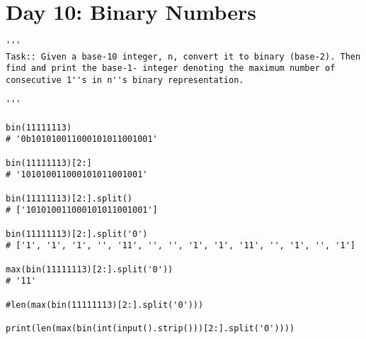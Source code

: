 \documentclass[11pt,a4paper]{article}
\begin{document}
\newpage
\section{Day 10: Binary Numbers}
\begin{lstlisting}
'''
Task:: Given a base-10 integer, n, convert it to binary (base-2). Then find and print the base-1- integer denoting the maximum number of consecutive 1''s in n''s binary representation.

'''

bin(11111113)
# '0b101010011000101011001001'

bin(11111113)[2:]
# '101010011000101011001001'

bin(11111113)[2:].split()
# ['101010011000101011001001']

bin(11111113)[2:].split('0')
# ['1', '1', '1', '', '11', '', '', '1', '1', '11', '', '1', '', '1']

max(bin(11111113)[2:].split('0'))
# '11'

#len(max(bin(11111113)[2:].split('0')))

print(len(max(bin(int(input().strip()))[2:].split('0'))))
\end{lstlisting}



\newpage
\end{document}
